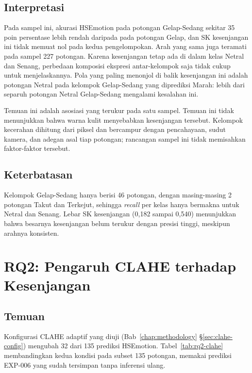 \subsection*{Interpretasi}

Pada sampel ini, akurasi HSEmotion pada potongan Gelap-Sedang sekitar 35 poin persentase lebih rendah daripada pada potongan Gelap, dan SK kesenjangan ini tidak memuat nol pada kedua pengelompokan. Arah yang sama juga teramati pada sampel 227 potongan. Karena kesenjangan tetap ada di dalam kelas Netral dan Senang, perbedaan komposisi ekspresi antar-kelompok saja tidak cukup untuk menjelaskannya. Pola yang paling menonjol di balik kesenjangan ini adalah potongan Netral pada kelompok Gelap-Sedang yang diprediksi Marah: lebih dari separuh potongan Netral Gelap-Sedang mengalami kesalahan ini.

Temuan ini adalah asosiasi yang terukur pada satu sampel. Temuan ini tidak menunjukkan bahwa warna kulit menyebabkan kesenjangan tersebut. Kelompok kecerahan dihitung dari piksel dan bercampur dengan pencahayaan, sudut kamera, dan adegan asal tiap potongan; rancangan sampel ini tidak memisahkan faktor-faktor tersebut.

\subsection*{Keterbatasan}

Kelompok Gelap-Sedang hanya berisi 46 potongan, dengan masing-masing 2 potongan Takut dan Terkejut, sehingga \textit{recall} per kelas hanya bermakna untuk Netral dan Senang. Lebar SK kesenjangan (0,182 sampai 0,540) menunjukkan bahwa besarnya kesenjangan belum terukur dengan presisi tinggi, meskipun arahnya konsisten.

\section{RQ2: Pengaruh CLAHE terhadap Kesenjangan}
\label{sec:rq2-results}

\subsection*{Temuan}

Konfigurasi CLAHE adaptif yang diuji (Bab~\ref{chap:methodology} \S\ref{sec:clahe-config}) mengubah 32 dari 135 prediksi HSEmotion. Tabel~\ref{tab:rq2-clahe} membandingkan kedua kondisi pada subset 135 potongan, memakai prediksi EXP-006 yang sudah tersimpan tanpa inferensi ulang.

